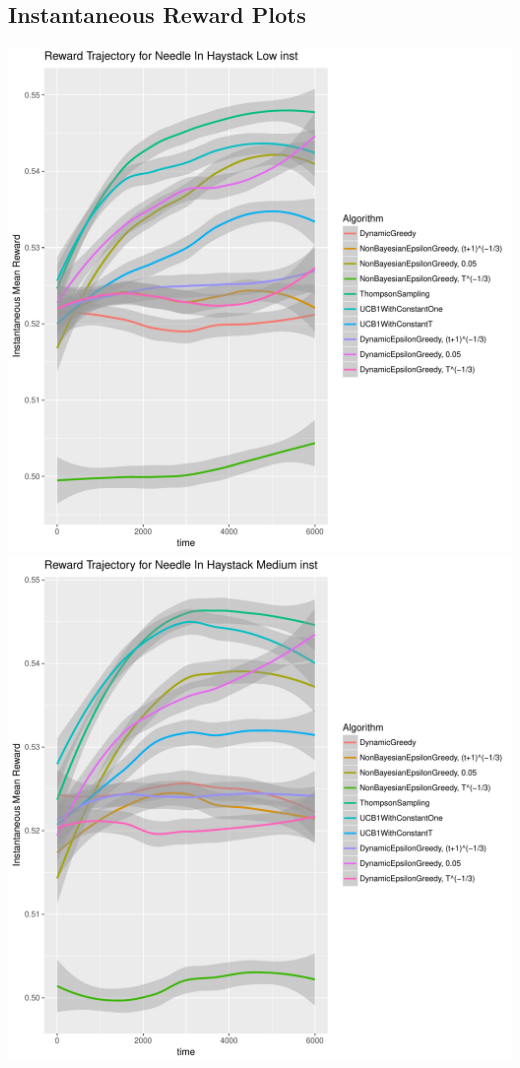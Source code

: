 \documentclass[11pt,letterpaper]{article}
\begin{document}
\subsection*{Instantaneous Reward Plots}
\includegraphics[scale=0.5]{"../results/Reward Trajectory for Needle In Haystack Low inst"} \\
\includegraphics[scale=0.5]{"../results/Reward Trajectory for Needle In Haystack Medium inst"} \\
\end{document}
